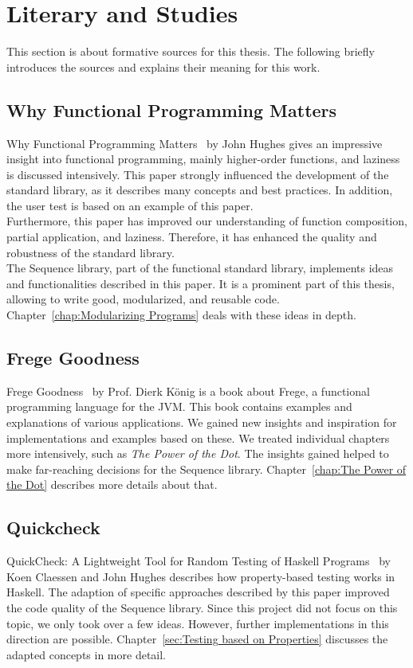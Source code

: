 \section{Literary and Studies}
\label{sec:Literary and Studies}
This section is about formative sources for this thesis. The following briefly
introduces the sources and explains their meaning for this work.

\subsection{Why Functional Programming Matters}
\label{sub:Functional Programming Matters}
Why Functional Programming Matters~\cite{hughes_why_1989} by John Hughes gives
an impressive insight into functional programming, mainly higher-order
functions, and laziness is discussed intensively. This paper strongly
influenced the development of the standard library, as it describes many
concepts and best practices. In addition, the user test is based on an example
of this paper. \\ 
Furthermore, this paper has improved our understanding of function composition,
partial application, and laziness. Therefore, it has enhanced the quality and
robustness of the standard library. \\
The Sequence library, part of the functional standard library, implements ideas
and functionalities described in this paper. It is a prominent part of this
thesis, allowing to write good, modularized, and reusable code.
Chapter~\ref{chap:Modularizing Programs} deals with these ideas in depth.


\subsection{Frege Goodness}
\label{sub:Frege Goodness}
Frege Goodness~\cite{frege_goodness} by Prof. Dierk König is a book about
Frege, a functional programming language for the JVM. This book contains
examples and explanations of various applications. We gained new insights and
inspiration for implementations and examples based on these. We treated
individual chapters more intensively, such as \textit{The Power of the Dot}.
The insights gained helped to make far-reaching decisions for the Sequence
library. Chapter~\ref{chap:The Power of the Dot} describes more details about
that.

\subsection{Quickcheck}
\label{sub:Quickcheck}
QuickCheck: A Lightweight Tool for Random Testing of Haskell
Programs~\cite{quickcheck_hughes} by Koen Claessen and John Hughes describes
how property-based testing works in Haskell. The adaption of specific
approaches described by this paper improved the code quality of the Sequence
library. Since this project did not focus on this topic, we only took over a few
ideas. However, further implementations in this direction are possible.
Chapter~\ref{sec:Testing based on Properties} discusses the adapted
concepts in more detail. 


